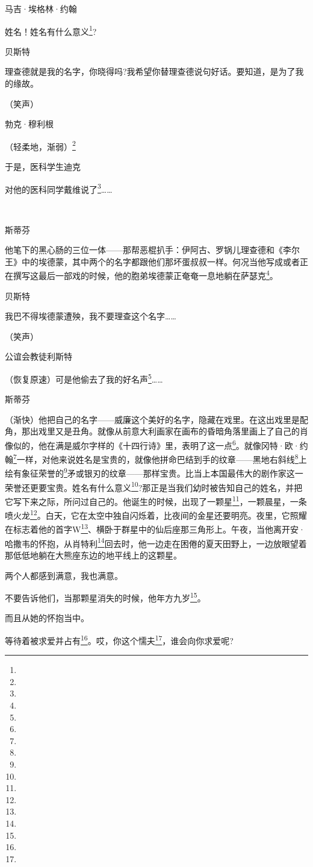 \par 马吉·埃格林·约翰
\par 姓名！姓名有什么意义\footnote{}?
\par 贝斯特
\par 理查德就是我的名字，你晓得吗?我希望你替理查德说句好话。要知道，是为了我的缘故。
\par （笑声）
\par 勃克·穆利根
\par （轻柔地，渐弱）\footnote{}
\par 于是，医科学生迪克
\par 对他的医科同学戴维说了\footnote{}……
\par  
\par 斯蒂芬
\par 他笔下的黑心肠的三位一体——那帮恶棍扒手：伊阿古、罗锅儿理查德和《李尔王》中的埃德蒙，其中两个的名字都跟他们那坏蛋叔叔一样。何况当他写成或者正在撰写这最后一部戏的时候，他的胞弟埃德蒙正奄奄一息地躺在萨瑟克\footnote{}。
\par 贝斯特
\par 我巴不得埃德蒙遭殃，我不要理查这个名字……
\par （笑声）
\par 公谊会教徒利斯特
\par （恢复原速）可是他偷去了我的好名声\footnote{}……
\par 斯蒂芬
\par （渐快）他把自己的名字——威廉这个美好的名字，隐藏在戏里。在这出戏里是配角，那出戏里又是丑角。就像从前意大利画家在画布的昏暗角落里画上了自己的肖像似的，他在满是威尔字样的《十四行诗》里，表明了这一点\footnote{}。就像冈特·欧·约翰\footnote{}一样，对他来说姓名是宝贵的，就像他拼命巴结到手的纹章——黑地右斜线\footnote{}上绘有象征荣誉的\footnote{}矛或银刃的纹章——那样宝贵。比当上本国最伟大的剧作家这一荣誉还更要宝贵。姓名有什么意义\footnote{}?那正是当我们幼时被告知自己的姓名，并把它写下来之际，所问过自己的。他诞生的时候，出现了一颗星\footnote{}，一颗晨星，一条喷火龙\footnote{}。白天，它在太空中独自闪烁着，比夜间的金星还要明亮。夜里，它照耀在标志着他的首字W\footnote{}、横卧于群星中的仙后座那三角形上。午夜，当他离开安·哈撒韦的怀抱，从肖特利\footnote{}回去时，他一边走在困倦的夏天田野上，一边放眼望着那低低地躺在大熊座东边的地平线上的这颗星。
\par 两个人都感到满意，我也满意。
\par 不要告诉他们，当那颗星消失的时候，他年方九岁\footnote{}。
\par 而且从她的怀抱当中。
\par 等待着被求爱并占有\footnote{}。哎，你这个懦夫\footnote{}，谁会向你求爱呢?
